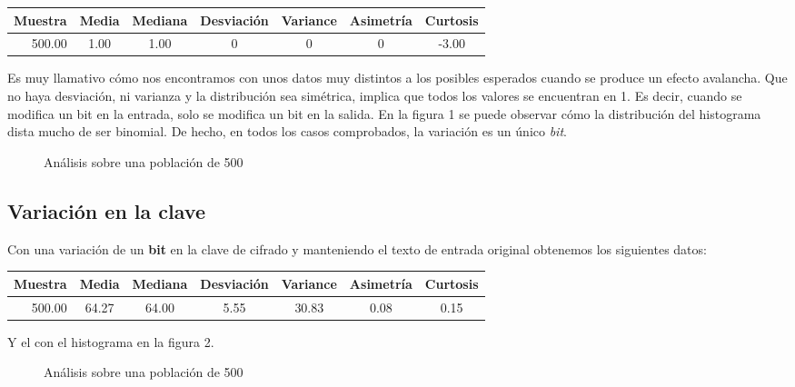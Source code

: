 \documentclass[11pt,a4paper]{article}
\begin{document}
\begin{center}
  \label{tab:text}
  \begin{tabular}[c]{| r | *{6}{c} |}
  \hline
    Muestra & Media & Mediana & Desviación & Variance & Asimetría & Curtosis \\ \hline
    500.00  & 1.00  &  1.00   & 0	   &   0      &  0	  & -3.00    \\
  \hline
  \end{tabular}
\end{center}

Es muy llamativo cómo nos encontramos con unos datos muy distintos a
los posibles esperados cuando se produce un efecto avalancha. Que no haya desviación, ni varianza y la distribución sea simétrica, implica que todos los valores se encuentran en 1. Es decir, cuando se modifica un bit en la entrada, solo se modifica un bit en la salida. En la figura 1 se puede observar cómo la distribución del histograma dista mucho de ser binomial. De hecho, en todos los casos comprobados, la variación es un único \emph{bit}.

\begin{figure}[H]
  \centering
  \label{fig:text}
  
  \caption{Análisis sobre una población de 500}
\end{figure}

\subsection{Variación en la clave}

Con una variación de un \textbf{bit} en la clave de cifrado y manteniendo el texto de entrada original obtenemos los siguientes datos:

\begin{center}
  \label{tab:key}
  \begin{tabular}[c]{| r | *{6}{c} |}
  \hline
    Muestra & Media & Mediana & Desviación & Variance & Asimetría & Curtosis \\ \hline
    500.00  & 64.27 &   64.00 &       5.55 &    30.83 &      0.08 &     0.15 \\
  \hline
  \end{tabular}
\end{center}

Y el con el histograma en la figura 2.

\begin{figure}[H]
  \centering
  \label{fig:key}
  
  \caption{Análisis sobre una población de 500}
\end{figure}
\end{document}
